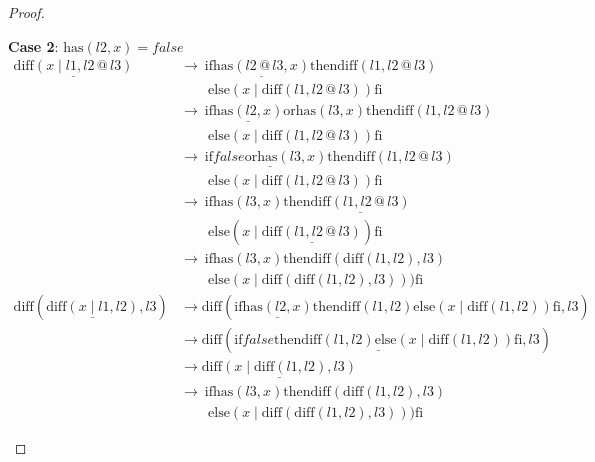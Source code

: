 \documentclass[12pt, a4paper]{article}
\newcommand{\rel}[1]{\mathrel{#1}}
\newcommand{\rmx}[1]{\mathrm{#1}}
\newcommand{\larrow}{\longrightarrow}
\newcommand{\under}{\underline}
\begin{document}
\begin{proof}
\begin{description}
\textbf{Case 2}: $\rmx{has}(l2, x) = false$
\begin{align*}
\under{\rmx{diff}(x \rel{|} l1, l2 \rel{@} l3)}
	&\larrow\ \rel{\rmx{if}} \under{\rmx{has}(l2 \rel{@} l3, x)} \rel{\rmx{then}} \rmx{diff}(l1,l2 \rel{@} l3) \\
	&\quad \quad \rel{\rmx{else}} (x \rel{|} \rmx{diff}(l1, l2 \rel{@} l3)) \rel{\rmx{fi}} \tag{by } \\
	&\larrow\ \rel{\rmx{if}} \under{\rmx{has}(l2, x)} \rel{\rmx{or}} \rmx{has}(l3, x) \rel{\rmx{then}} \rmx{diff}(l1,l2 \rel{@} l3) \\
	&\quad \quad \rel{\rmx{else}} (x \rel{|} \rmx{diff}(l1, l2 \rel{@} l3)) \rel{\rmx{fi}} \tag{by Lemma 1 from Problem 6} \\
	&\larrow\ \rel{\rmx{if}} \under{false \rel{\rmx{or}} \rmx{has}(l3, x)} \rel{\rmx{then}} \rmx{diff}(l1,l2 \rel{@} l3) \\
	&\quad \quad \rel{\rmx{else}} (x \rel{|} \rmx{diff}(l1, l2 \rel{@} l3)) \rel{\rmx{fi}} \tag{by case splitting} \\
	&\larrow\ \rel{\rmx{if}} \rmx{has}(l3, x) \rel{\rmx{then}} \under{\rmx{diff}(l1,l2 \rel{@} l3)} \\
	&\quad \quad \rel{\rmx{else}} (x \rel{|} \under{\rmx{diff}(l1, l2 \rel{@} l3)}) \rel{\rmx{fi}} \tag{by or} \\
	&\larrow\ \rel{\rmx{if}} \rmx{has}(l3, x) \rel{\rmx{then}} \rmx{diff}(\rmx{diff}(l1, l2), l3) \\
	&\quad \quad \rel{\rmx{else}} (x \rel{|} \rmx{diff}(\rmx{diff}(l1, l2), l3))) \rel{\rmx{fi}} \tag{by IH} \\
\rmx{diff}(\under{\rmx{diff}(x \rel{|} l1, l2)}, l3)
	&\larrow \rmx{diff}(\rel{\rmx{if}} \under{\rmx{has}(l2, x)} \rel{\rmx{then}} \rmx{diff}(l1, l2) \rel{\rmx{else}} (x \rel{|} \rmx{diff}(l1, l2)) \rel{\rmx{fi}}, l3) \tag{by diff2} \\
	&\larrow \rmx{diff}(\under{\rel{\rmx{if}} false \rel{\rmx{then}} \rmx{diff}(l1, l2) \rel{\rmx{else}} (x \rel{|} \rmx{diff}(l1, l2)) \rel{\rmx{fi}}}, l3) \tag{by case splitting} \\
	&\larrow \under{\rmx{diff}(x \rel{|} \rmx{diff}(l1, l2), l3)} \tag{by if2} \\
	&\larrow\ \rel{\rmx{if}} \rmx{has}(l3, x) \rel{\rmx{then}} \rmx{diff}(\rmx{diff}(l1, l2), l3) \\
	&\quad \quad \rel{\rmx{else}} (x \rel{|} \rmx{diff}(\rmx{diff}(l1, l2), l3))) \rel{\rmx{fi}} \tag{by diff2}
\end{align*}

\end{description}
\end{proof}
\end{document}
